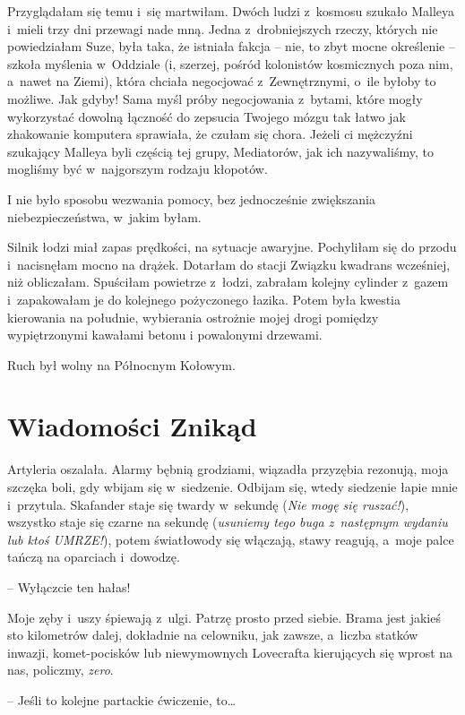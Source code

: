 \documentclass[oneside,polish,11pt,sfheadings]{mwbk}
\begin{document}
Przyglądałam się temu i~się martwiłam. Dwóch ludzi z~kosmosu szukało
Malleya i~mieli trzy dni przewagi nade mną. Jedna z~drobniejszych
rzeczy, których nie powiedziałam Suze, była taka, że istniała fakcja -- nie, to zbyt mocne określenie -- szkoła myślenia w~Oddziale (i, szerzej,
pośród kolonistów kosmicznych poza nim, a~nawet na Ziemi), która chciała
negocjować z~Zewnętrznymi, o~ile byłoby to możliwe. Jak gdyby! Sama myśl
próby negocjowania z~bytami, które mogły wykorzystać dowolną łączność do
zepsucia Twojego mózgu tak łatwo jak zhakowanie komputera sprawiała, że
czułam się chora. Jeżeli ci mężczyźni szukający Malleya byli częścią tej
grupy, Mediatorów, jak ich nazywaliśmy, to mogliśmy być w~najgorszym
rodzaju kłopotów.

I nie było sposobu wezwania pomocy, bez jednocześnie zwiększania
niebezpieczeństwa, w~jakim byłam.

Silnik łodzi miał zapas prędkości, na sytuacje awaryjne. Pochyliłam się
do przodu i~nacisnęłam mocno na drążek. Dotarłam do stacji Związku
kwadrans wcześniej, niż obliczałam. Spuściłam powietrze z~łodzi,
zabrałam kolejny cylinder z~gazem i~zapakowałam je do kolejnego
pożyczonego łazika. Potem była kwestia kierowania na południe,
wybierania ostrożnie mojej drogi pomiędzy wypiętrzonymi kawałami betonu
i powalonymi drzewami.

Ruch był wolny na Północnym Kołowym.

\chapter{Wiadomości Znikąd}

Artyleria oszalała. Alarmy bębnią grodziami, wiązadła przyzębia rezonują,
moja szczęka boli, gdy wbijam się w~siedzenie. Odbijam się, wtedy
siedzenie łapie mnie i~przytula. Skafander staje się twardy w~sekundę
(\textit{Nie mogę się ruszać!}), wszystko staje się czarne na sekundę
(\textit{usuniemy tego buga z~następnym wydaniu lub ktoś UMRZE!}), potem
światłowody się włączają, stawy reagują, a~moje palce tańczą na
oparciach i~dowodzę.

-- Wyłączcie ten hałas!

Moje zęby i~uszy śpiewają z~ulgi. Patrzę prosto przed siebie. Brama jest
jakieś sto kilometrów dalej, dokładnie na celowniku, jak zawsze, a~liczba statków inwazji, komet-pocisków lub niewymownych Lovecrafta
kierujących się wprost na nas, policzmy, \textit{zero}.

-- Jeśli to kolejne partackie ćwiczenie, to\ldots 
\end{document}
